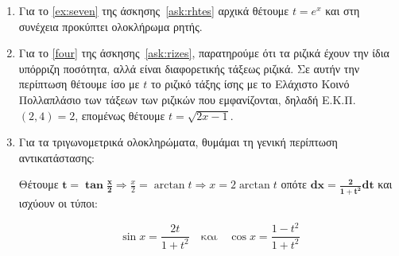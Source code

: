 \begin{center}
  \minibox{\bfseries\large \textcolor{Col1}{Παρατηρήσεις-Υποδείξεις}}
\end{center}

\vspace{\baselineskip}

\begin{enumerate}
  \item Για το \ref{ex:seven} της άσκησης~\eqref{ask:rhtes} αρχικά θέτουμε $
    t = e^{x} $ και στη συνέχεια προκύπτει ολοκλήρωμα ρητής.
  \item Για το \ref{four} της άσκησης~\eqref{ask:rizes}, παρατηρούμε ότι τα ριζικά 
    έχουν την ίδια υπόρριζη ποσότητα, αλλά είναι διαφορετικής τάξεως ριζικά. 
    Σε αυτήν την περίπτωση θέτουμε ίσο με $t$ το ριζικό τάξης ίσης με το Ελάχιστο Κοινό
    Πολλαπλάσιο των τάξεων των ριζικών που εμφανίζονται, δηλαδή Ε.Κ.Π. $(2,4)
    = 2 $, επομένως θέτουμε $t=\sqrt{2x-1}$. 
  \item Για τα τριγωνομετρικά ολοκληρώματα, θυμάμαι τη γενική περίπτωση αντικατάστασης: 
    \begin{center}
      Θέτουμε $ \boldsymbol{t = \tan{\frac{x}{2}}} \Rightarrow \frac{x}{2} = \arctan{t} 
      \Rightarrow x = 2 \arctan {t} $ οπότε $ \boldsymbol{dx = \frac{2}{1 + t^{2}} dt} $ 
      και ισχύουν οι τύποι:
    \end{center}
    \[
      \boxed{\sin x=\frac{2t}{1+t^2}} \quad \text{και} \quad \boxed{\cos x
      =\frac{1-t^2}{1+t^2}}
    \] 
\end{enumerate}



